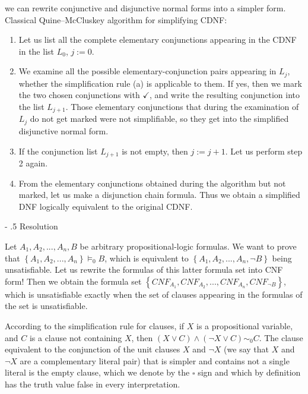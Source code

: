 \documentclass[margin=0px]{article}
\makeatletter
\renewcommand\paragraph{%
	\@startsection{paragraph}{4}{0mm}%
	{-\baselineskip}%
	{.5\baselineskip}%
	{\normalfont\normalsize\bfseries}}
\makeatother
\begin{document}
we can rewrite conjunctive and disjunctive normal forms into a simpler form.\\

\noindent Classical Quine--McCluskey algorithm for simplifying CDNF:

\begin{enumerate}
    \item	Let us list all the complete elementary conjunctions appearing in the CDNF in the list $L_{0}$, $j:=0$.

    \item	We examine all the possible elementary-conjunction pairs appearing in $L_{j}$, whether the
          simplification rule (a) is applicable to them. If yes, then we mark the two chosen conjunctions with $\checkmark$,
          and write the resulting conjunction into the list $L_{j+1}$. Those elementary conjunctions that during the examination of $L_{j}$
          do not get marked were not simplifiable, so they get into the simplified disjunctive
          normal form.

    \item	If the conjunction list $L_{j+1}$ is not empty, then $j:=j+1$. Let us perform step 2 again.

    \item	From the elementary conjunctions obtained during the algorithm but not marked, let us make a disjunction
          chain formula. Thus we obtain a simplified DNF logically equivalent to the original CDNF.
\end{enumerate}

\paragraph{Resolution}

Let $A_{1}, A_{2}, ... , A_{n}, B$ be arbitrary propositional-logic formulas.
We want to prove that $\left\{A_{1}, A_{2}, ... , A_{n}\right\} \models_{0} B$,
which is equivalent to $\left\{A_{1}, A_{2}, ... , A_{n}, \neg B\right\}$ being unsatisfiable.
Let us rewrite the formulas of this latter formula set into CNF form! Then we obtain the
formula set $\left\{CNF_{A_{1}}, CNF_{A_{2}}, ... , CNF_{A_{n}}, CNF_{\neg B}\right\}$,
which is unsatisfiable exactly when the set of clauses appearing in the formulas of the set is
unsatisfiable.

According to the simplification rule for clauses, if $X$ is a propositional variable, and $C$ is a clause not
containing $X$, then $(X \vee C) \wedge (\neg X \vee C) \sim_{0} C$. The clause equivalent to the conjunction of the
unit clauses $X$ and $\neg X$ (we say that $X$ and $\neg X$ are a complementary literal pair) that is
simpler and contains not a single literal is the empty clause, which we denote by the $\square$ sign
and which by definition has the truth value false in every interpretation.
\end{document}
